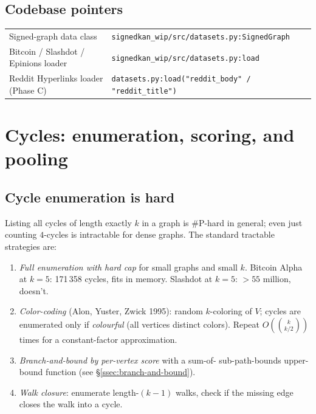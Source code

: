 \documentclass[11pt,a4paper]{article}
\theoremstyle{remark}
\begin{document}
\subsection{Codebase pointers}

\begin{tabular}{ll}
Signed-graph data class & \texttt{signedkan\_wip/src/datasets.py:SignedGraph} \\
Bitcoin / Slashdot / Epinions loader & \texttt{signedkan\_wip/src/datasets.py:load} \\
Reddit Hyperlinks loader (Phase C) & \texttt{datasets.py:load("reddit\_body" / "reddit\_title")} \\
\end{tabular}

\section{Cycles: enumeration, scoring, and pooling}\label{sec:cycles}

\subsection{Cycle enumeration is hard}

Listing all cycles of length exactly $k$ in a graph is
$\#$P-hard in general; even just counting $4$-cycles is
intractable for dense graphs. The standard tractable strategies
are:

\begin{enumerate}[label=(\Roman*)]
\item \emph{Full enumeration with hard cap} for small graphs and
      small $k$. Bitcoin Alpha at $k = 5$: 171\,358 cycles, fits
      in memory. Slashdot at $k = 5$: $> 55$ million, doesn't.
\item \emph{Color-coding} (Alon, Yuster, Zwick 1995): random
      $k$-coloring of $V$; cycles are enumerated only if
      \emph{colourful} (all vertices distinct colors). Repeat
      $O(\binom{k}{k/2})$ times for a constant-factor approximation.
\item \emph{Branch-and-bound by per-vertex score} with a sum-of-
      sub-path-bounds upper-bound function (see
      \S\ref{ssec:branch-and-bound}).
\item \emph{Walk closure}: enumerate length-$(k-1)$ walks, check
      if the missing edge closes the walk into a cycle.
\end{enumerate}
\end{document}
